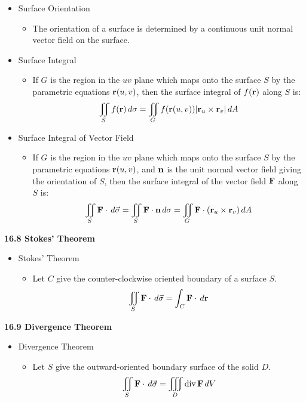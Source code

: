   \begin{itemize}

    \item Surface Orientation
      \begin{itemize}
        \item The orientation of a surface is determined by a continuous unit normal vector field on the surface.
      \end{itemize}

    \item Surface Integral
      \begin{itemize}
        \item If $G$ is the region in the $uv$ plane which maps onto the surface $S$ by the parametric equations $\mathbf{r}(u,v)$, then the surface integral of $f(\mathbf{r})$ along $S$ is:
          \[
            \iint_S f(\mathbf{r})\,d{\sigma} = \iint_G f(\mathbf{r}(u,v))|\mathbf{r}_u\times\mathbf{r}_v|\,d{A}
          \]
      \end{itemize}

    \item Surface Integral of Vector Field
      \begin{itemize}
        \item If $G$ is the region in the $uv$ plane which maps onto the surface $S$ by the parametric equations $\mathbf{r}(u,v)$, and $\mathbf{n}$ is the unit normal vector field giving the orientation of $S$, then the surface integral of the vector field $\mathbf{F}$ along $S$ is:
          \[
            \iint_S \mathbf{F}\cdot\,d{\vec\sigma} = \iint_S \mathbf{F}\cdot\mathbf{n}\,d{\sigma} = \iint_G \mathbf{F}\cdot(\mathbf{r}_u\times\mathbf{r}_v)\,d{A}
          \]
      \end{itemize}
  \end{itemize}

\newpage

\centerline{\bf 16.8 Stokes' Theorem}
  \begin{itemize}
  \item Stokes' Theorem
    \begin{itemize}
    \item Let $C$ give the counter-clockwise oriented boundary of a surface $S$.
    \[
      \iint_S \mathbf{F}\cdot\,d{\vec\sigma} = \int_C \mathbf{F}\cdot\,d{\mathbf{r}}
    \]
    \end{itemize}
  \end{itemize}

\hruler

\centerline{\bf 16.9 Divergence Theorem}
  \begin{itemize}
  \item Divergence Theorem
    \begin{itemize}
    \item Let $S$ give the outward-oriented boundary surface of the solid $D$.
    \[
      \iint_S \mathbf{F}\cdot\,d{\vec\sigma} = \iiint_D \textrm{div}\,{\mathbf{F}}\,d{V}
    \]
    \end{itemize}
  \end{itemize}
  
